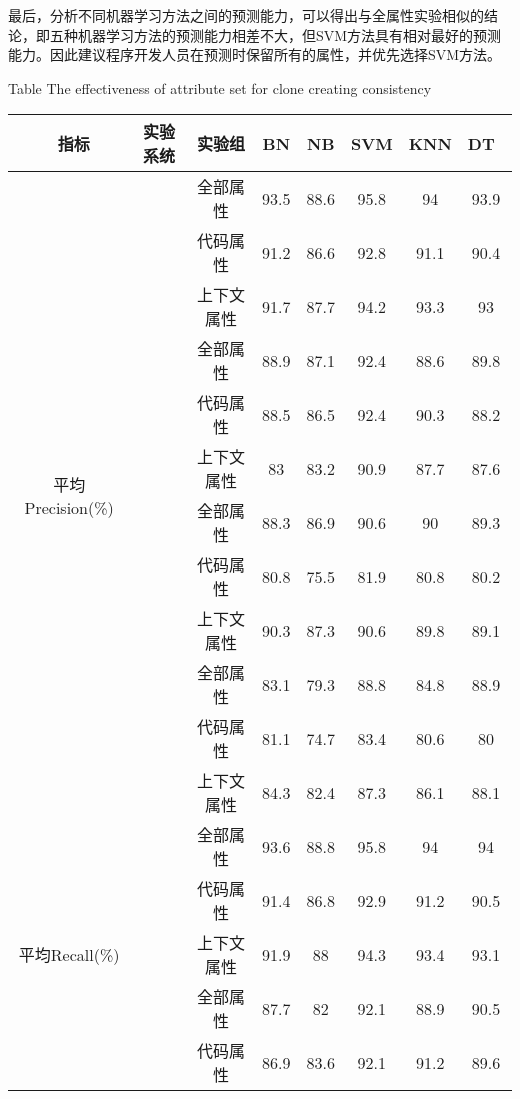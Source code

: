 最后，分析不同机器学习方法之间的预测能力，可以得出与全属性实验相似的结论，即五种机器学习方法的预测能力相差不大，但SVM方法具有相对最好的预测能力。因此建议程序开发人员在预测时保留所有的属性，并优先选择SVM方法。


\begin{table} [htbp]
\renewcommand\arraystretch{0.9} 
{Table$\!$}
{The effectiveness of attribute set for clone creating consistency}
\vspace{0.5em}
\centering
\wuhao
\begin{tabular}{cccccccc}
\toprule[1.5pt]
~{指标}&{实验系统}&{实验组}&{BN}&{NB}&{SVM}&{KNN}&{DT}~\\
\midrule[1pt]
\multirow{12}{*}{平均Precision(\%)}
&~\multirow{3}{*}{ArgoUML}
&全部属性& 93.5    & 88.6  &95.8 & 94  & 93.9 \\
& & 代码属性& 91.2    & 86.6  & 92.8 & 91.1 & 90.4 \\
&  & 上下文属性& 91.7    & 87.7  & 94.2 & 93.3 &93  \\
\cline{2-8}
&~\multirow{3}{*}{jEdit}
& 全部属性& 88.9    & 87.1  & 92.4 &88.6 & 89.8 \\
&    &代码属性& 88.5    & 86.5  & 92.4 & 90.3 & 88.2 \\
&    &  上下文属性 & 83     &83.2  & 90.9 & 87.7 & 87.6 \\
\cline{2-8}
&~\multirow{3}{*}{jFreeChart}
& 全部属性& 88.3    & 86.9  &90.6 &90  & 89.3 \\
&  &代码属性 & 80.8    & 75.5  & 81.9 & 80.8 & 80.2 \\
&  & 上下文属性& 90.3    & 87.3  & 90.6 & 89.8 & 89.1 \\
\cline{2-8}
&~\multirow{3}{*}{Tuxguitar} 
&全部属性 & 83.1    & 79.3  & 88.8 & 84.8 & 88.9 \\
&   &代码属性& 81.1    & 74.7  & 83.4 & 80.6 & 80   \\
&    &  上下文属性& 84.3    & 82.4  & 87.3 & 86.1 & 88.1 \\
\hline
\multirow{12}{*}{平均Recall(\%)}&
~\multirow{3}{*}{ArgoUML}
&全部属性 & 93.6    & 88.8  & 95.8 & 94  & 94  \\
&   &代码属性 & 91.4    & 86.8  & 92.9 & 91.2 & 90.5 \\
&   &  上下文属性& 91.9    & 88   & 94.3 & 93.4 & 93.1 \\
\cline{2-8}
&~\multirow{3}{*}{jEdit}
& 全部属性& 87.7    & 82   & 92.1 & 88.9 & 90.5 \\
&   &代码属性 & 86.9    & 83.6  & 92.1 & 91.2 & 89.6 \\

\end{tabular}
\end{table}
